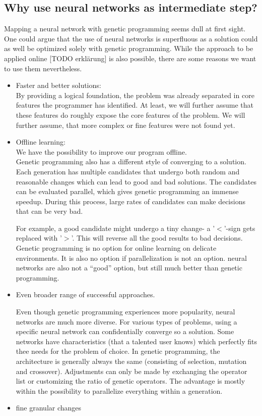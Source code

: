 \subsection{Why use neural networks as intermediate step?}
Mapping a neural network with genetic programming seems dull at first sight. One could argue that the use of neural networks is superfluous as a solution could as well be optimized solely with genetic programming. While the approach to be applied online [TODO erklärung] is also possible, there are some reasons we want to use them nevertheless.
\begin{itemize}
    \item Faster and better solutions:\\
    By providing a logical foundation, the problem was already separated in core features the programmer has identified. At least, we will further assume that these features do roughly expose the core features of the problem. We will further assume, that more complex or fine features were not found yet.
    \item Offline learning:\\
    We have the possibility to improve our program offline.\\
    Genetic programming also has a different style of converging to a solution. Each generation has multiple candidates that undergo both random and reasonable changes which can lead to good and bad solutions. The candidates can be evaluated parallel, which gives genetic programming an immense speedup. During this process, large rates of  candidates can make decisions that can be very bad.
    
    For example, a good candidate might undergo a tiny change- a '$<$'-sign gets replaced with '$>$'. This will reverse all the good results to bad decisions. Genetic programming is no option for online learning on delicate environments. It is also no option if parallelization is not an option. neural networks are also not a ``good'' option, but still much better than genetic programming.
    \item Even broader range of successful approaches.
    
    Even though genetic programming experiences more popularity, neural networks are much more diverse. For various types of problems, using a specific neural network can confidentially converge so a solution. Some networks have characteristics (that a talented user knows) which perfectly fits thee needs for the problem of choice. In genetic programming, the architecture is generally always the same (consisting of selection, mutation and crossover). Adjustments can only be made by exchanging the operator list or customizing the ratio of genetic operators. The advantage is mostly within the possibility to parallelize everything within a generation.
    \item fine granular changes
    

\end{itemize}
